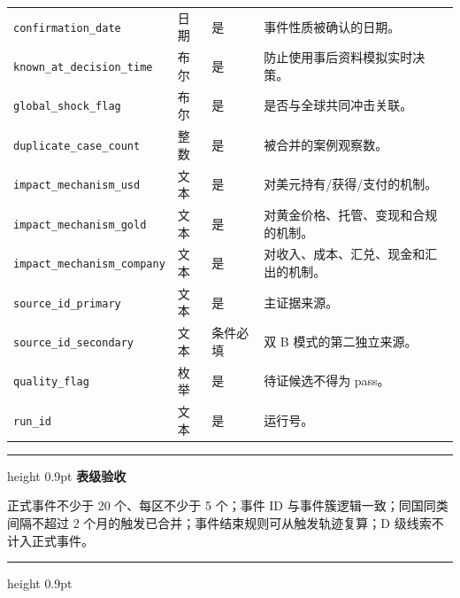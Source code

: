 \documentclass[UTF8,fontset=windows,12pt,openany]{ctexbook}
\newenvironment{gatebox}[1][]{%
  \par\medskip\noindent\begin{center}\begin{minipage}{0.93\textwidth}%
  \color{GoldLine}\hrule height 0.9pt\vspace{0.45em}%
  \textbf{#1}\par\smallskip\color{black}%
}{%
  \par\vspace{0.35em}\color{GoldLine}\hrule height 0.9pt%
  \end{minipage}\end{center}\medskip%
}
\newcommand{\Field}[1]{{\small\nolinkurl{#1}}}
\begin{document}
\begin{longtable}{p{3.6cm}p{2.3cm}p{2.1cm}p{5.2cm}}
\Field{confirmation_date} & 日期 & 是 & 事件性质被确认的日期。\\
\Field{known_at_decision_time} & 布尔 & 是 & 防止使用事后资料模拟实时决策。\\
\Field{global_shock_flag} & 布尔 & 是 & 是否与全球共同冲击关联。\\
\Field{duplicate_case_count} & 整数 & 是 & 被合并的案例观察数。\\
\Field{impact_mechanism_usd} & 文本 & 是 & 对美元持有/获得/支付的机制。\\
\Field{impact_mechanism_gold} & 文本 & 是 & 对黄金价格、托管、变现和合规的机制。\\
\Field{impact_mechanism_company} & 文本 & 是 & 对收入、成本、汇兑、现金和汇出的机制。\\
\Field{source_id_primary} & 文本 & 是 & 主证据来源。\\
\Field{source_id_secondary} & 文本 & 条件必填 & 双 B 模式的第二独立来源。\\
\Field{quality_flag} & 枚举 & 是 & 待证候选不得为 pass。\\
\Field{run_id} & 文本 & 是 & 运行号。\\
\bottomrule
\end{longtable}

\begin{gatebox}[表级验收]
正式事件不少于 20 个、每区不少于 5 个；事件 ID 与事件簇逻辑一致；同国同类间隔不超过 2 个月的触发已合并；事件结束规则可从触发轨迹复算；D 级线索不计入正式事件。
\end{gatebox}
\end{document}
